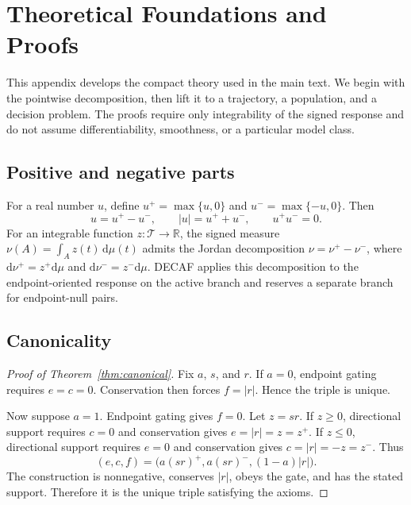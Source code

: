 \section{Theoretical Foundations and Proofs}
\label{app:theory}

This appendix develops the compact theory used in the main text. We begin with the pointwise decomposition, then lift it to a trajectory, a population, and a decision problem. The proofs require only integrability of the signed response and do not assume differentiability, smoothness, or a particular model class.

\subsection{Positive and negative parts}
\label{app:jordan}

For a real number $u$, define $u^{+}=\max\{u,0\}$ and $u^{-}=\max\{-u,0\}$. Then
\begin{equation}
    u=u^{+}-u^{-},
    \qquad
    |u|=u^{+}+u^{-},
    \qquad
    u^{+}u^{-}=0.
    \label{eq:positive-negative}
\end{equation}
For an integrable function $z:\mathcal T\rightarrow\mathbb R$, the signed measure $\nu(A)=\int_A z(t)\,\mathrm d\mu(t)$ admits the Jordan decomposition $\nu=\nu^{+}-\nu^{-}$, where $\mathrm d\nu^{+}=z^{+}\mathrm d\mu$ and $\mathrm d\nu^{-}=z^{-}\mathrm d\mu$. DECAF applies this decomposition to the endpoint-oriented response on the active branch and reserves a separate branch for endpoint-null pairs.

\subsection{Canonicality}

\begin{proof}[Proof of Theorem~\ref{thm:canonical}]
Fix $a$, $s$, and $r$. If $a=0$, endpoint gating requires $e=c=0$. Conservation then forces $f=|r|$. Hence the triple is unique.

Now suppose $a=1$. Endpoint gating gives $f=0$. Let $z=sr$. If $z\geq0$, directional support requires $c=0$ and conservation gives $e=|r|=z=z^{+}$. If $z\leq0$, directional support requires $e=0$ and conservation gives $c=|r|=-z=z^{-}$. Thus
\begin{equation}
    (e,c,f)=\bigl(a(sr)^{+},a(sr)^{-},(1-a)|r|\bigr).
\end{equation}
The construction is nonnegative, conserves $|r|$, obeys the gate, and has the stated support. Therefore it is the unique triple satisfying the axioms.
\end{proof}

